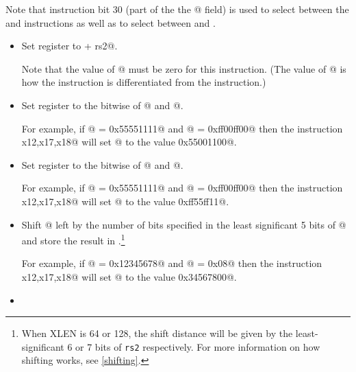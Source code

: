 Note that instruction bit 30 (part of the the @ field) 
is used to select between the \verb@add@ and \verb@sub@ instructions 
as well as to select between \verb@srl@ and \verb@sra@.

\begin{itemize}
\item{}
\label{insn:add}

Set register \verb@rd@ to  + rs2@.

Note that the value of @ must be zero for this instruction.
(The value of @ is how the \verb@add@ instruction is differentiated 
from the \verb@sub@ instruction.)

\item{}
\label{insn:and}

Set register \verb@rd@ to the bitwise \verb@and@ of @ and  @.

For example, if @ = \verb@0x55551111@ and @ = \verb@0xff00ff00@
then the instruction \verb@and x12,x17,x18@ will set @ to the
value \verb@0x55001100@.

\item{}
\label{insn:or}

Set register \verb@rd@ to the bitwise \verb@or@ of @ and  @.

For example, if @ = \verb@0x55551111@ and @ = \verb@0xff00ff00@
then the instruction \verb@or x12,x17,x18@ will set @ to the
value \verb@0xff55ff11@.

\item{}
\label{insn:sll}

Shift @ left by the number of bits specified in the least significant
5 bits of @ and store the result in \verb@rd@.\footnote{\label{shift:xlen}
When XLEN is 64 or 128, the shift distance will be given by the least-significant 
6 or 7 bits of {\tt rs2} respectively. 
For more information on how shifting works, see \autoref{shifting}.}

For example, if @ = \verb@0x12345678@ and @ = \verb@0x08@
then the instruction \verb@sll x12,x17,x18@ will set @ to the
value \verb@0x34567800@.

\item{}
\label{insn:slt}


\end{itemize}
